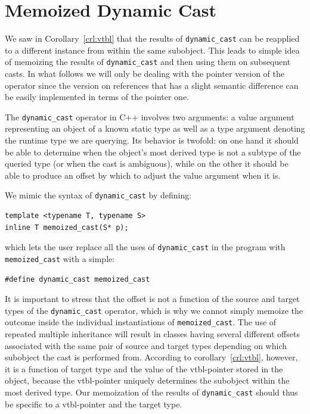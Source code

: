 \documentclass[preprint]{sigplanconf}
\makeatletter
\DeclareRobustCommand{\code}[1]{{\lstinline[breaklines=false,escapechar=@]{#1}}}
\makeatother
\begin{document}
\section{Memoized Dynamic Cast}
\label{sec:memcast}

We saw in Corollary~\ref{crl:vtbl} that the results of \code{dynamic_cast} can 
be reapplied to a different instance from within the same subobject. This leads 
to simple idea of memoizing the results of \code{dynamic_cast} and then using 
them on subsequent casts. In what follows we will only be dealing with the 
pointer version of the operator since the version on references that has a 
slight semantic difference can be easily implemented in terms of the pointer one.

The \code{dynamic_cast} operator in C++ involves two arguments: a value argument 
representing an object of a known static type as well as a type argument 
denoting the runtime type we are querying. Its behavior is twofold: on one hand 
it should be able to determine when the object's most derived type is not a 
subtype of the queried type (or when the cast is ambiguous), while on the other 
it should be able to produce an offset by which to adjust the value argument when it is.

We mimic the syntax of \code{dynamic_cast} by defining:

\begin{lstlisting}
template <typename T, typename S>
inline T memoized_cast(S* p);
\end{lstlisting}

\noindent
which lets the user replace all the uses of \code{dynamic_cast} in the program 
with \code{memoized_cast} with a simple:

\begin{lstlisting}
#define dynamic_cast memoized_cast
\end{lstlisting}

\noindent
It is important to stress that the offset is not a function of the source and target 
types of the \code{dynamic_cast} operator, which is why we cannot simply memoize the 
outcome inside the individual instantiations of \code{memoized_cast}.
The use of repeated multiple inheritance will result in classes having several 
different offsets associated with the same pair of source and target types 
depending on which subobject the cast is performed from. According to 
corollary~\ref{crl:vtbl}, however, it is a function of target type and the value 
of the vtbl-pointer stored in the object, because the vtbl-pointer uniquely 
determines the subobject within the most derived type. Our memoization of the 
results of \code{dynamic_cast} should thus be specific to a vtbl-pointer and the 
target type. 
\end{document}
